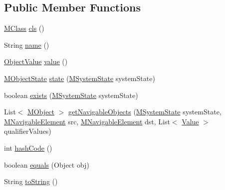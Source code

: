 \subsection*{Public Member Functions}
\begin{DoxyCompactItemize}
\item 
\hyperlink{interfaceorg_1_1tzi_1_1use_1_1uml_1_1mm_1_1_m_class}{M\-Class} \hyperlink{classorg_1_1tzi_1_1use_1_1uml_1_1sys_1_1_m_object_impl_a1db05f22e92468e57fc4ccb05ca4b619}{cls} ()
\item 
String \hyperlink{classorg_1_1tzi_1_1use_1_1uml_1_1sys_1_1_m_object_impl_a1ac717751267c8233b4f464281ecc37a}{name} ()
\item 
\hyperlink{classorg_1_1tzi_1_1use_1_1uml_1_1ocl_1_1value_1_1_object_value}{Object\-Value} \hyperlink{classorg_1_1tzi_1_1use_1_1uml_1_1sys_1_1_m_object_impl_a5b54c084b1ba08e6f85ed4f0c845aa84}{value} ()
\item 
\hyperlink{classorg_1_1tzi_1_1use_1_1uml_1_1sys_1_1_m_object_state}{M\-Object\-State} \hyperlink{classorg_1_1tzi_1_1use_1_1uml_1_1sys_1_1_m_object_impl_a20659c510cb9a5190ed70d1ce6ff68dc}{state} (\hyperlink{classorg_1_1tzi_1_1use_1_1uml_1_1sys_1_1_m_system_state}{M\-System\-State} system\-State)
\item 
boolean \hyperlink{classorg_1_1tzi_1_1use_1_1uml_1_1sys_1_1_m_object_impl_a2d28af8142820d999a63b95f62fc6528}{exists} (\hyperlink{classorg_1_1tzi_1_1use_1_1uml_1_1sys_1_1_m_system_state}{M\-System\-State} system\-State)
\item 
List$<$ \hyperlink{interfaceorg_1_1tzi_1_1use_1_1uml_1_1sys_1_1_m_object}{M\-Object} $>$ \hyperlink{classorg_1_1tzi_1_1use_1_1uml_1_1sys_1_1_m_object_impl_a8798f6f409d5ae7089ab26f69d537714}{get\-Navigable\-Objects} (\hyperlink{classorg_1_1tzi_1_1use_1_1uml_1_1sys_1_1_m_system_state}{M\-System\-State} system\-State, \hyperlink{interfaceorg_1_1tzi_1_1use_1_1uml_1_1mm_1_1_m_navigable_element}{M\-Navigable\-Element} src, \hyperlink{interfaceorg_1_1tzi_1_1use_1_1uml_1_1mm_1_1_m_navigable_element}{M\-Navigable\-Element} dst, List$<$ \hyperlink{classorg_1_1tzi_1_1use_1_1uml_1_1ocl_1_1value_1_1_value}{Value} $>$ qualifier\-Values)
\item 
int \hyperlink{classorg_1_1tzi_1_1use_1_1uml_1_1sys_1_1_m_object_impl_a64e4ebe1326bddde61da2b2ebca6146d}{hash\-Code} ()
\item 
boolean \hyperlink{classorg_1_1tzi_1_1use_1_1uml_1_1sys_1_1_m_object_impl_ace75bde7046fc0b130704b0fa59f6879}{equals} (Object obj)
\item 
String \hyperlink{classorg_1_1tzi_1_1use_1_1uml_1_1sys_1_1_m_object_impl_a61c59a0340092b032d8f973d9dcb7151}{to\-String} ()
\end{DoxyCompactItemize}


